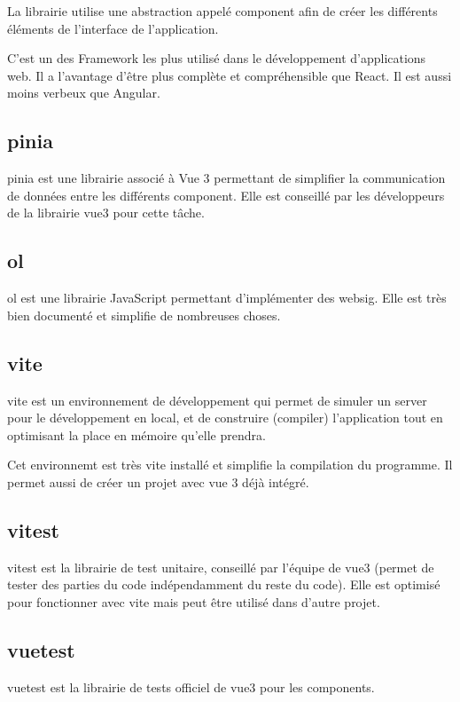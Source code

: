 \documentclass[
    iai, %
    il, %
]{heig-tb}
\begin{document}
La librairie utilise une abstraction appelé component afin de créer les différents éléments de l'interface de l'application.

C'est un des Framework les plus utilisé dans le développement d'applications web.
Il a l'avantage d'être plus complète et compréhensible que React. Il est aussi moins verbeux que Angular.

\subsection{\gls{pinia}}
\gls{pinia} est une librairie associé à Vue 3 permettant de simplifier la communication de données entre les différents component.
Elle est conseillé par les développeurs de la librairie \gls{vue3} pour cette tâche.

\subsection{\gls{ol}}
\gls{ol} est une librairie JavaScript permettant d'implémenter des \gls{websig}.
Elle est très bien documenté et simplifie de nombreuses choses.

\subsection{\gls{vite}}
\gls{vite} est un environnement de développement qui permet de simuler un server pour le développement en local,
et de construire (compiler) l'application tout en optimisant la place en mémoire qu'elle prendra.

Cet environnemt est très vite installé et simplifie la compilation du programme.
Il permet aussi de créer un projet avec vue 3 déjà intégré.

\subsection{\gls{vitest}}
\gls{vitest} est la librairie de test unitaire, conseillé par l'équipe de \gls{vue3} (permet de tester des parties du code indépendamment du reste du code).
Elle est optimisé pour fonctionner avec \gls{vite} mais peut être utilisé dans d'autre projet.

\subsection{\gls{vuetest}}
\gls{vuetest} est la librairie de tests officiel de \gls{vue3} pour les components.
\end{document}
